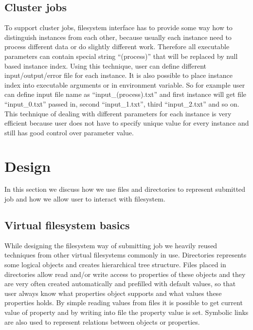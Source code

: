 \documentclass[a4paper,10pt,twocolumn]{article}
\newcommand{\code}[1]{``#1''}
\begin{document}
\subsection{Cluster jobs}
To support cluster jobs, filesystem interface has to provide some way how to distinguish instances from each other, because usually each instance need to process different data or do slightly different work. Therefore all executable parameters can contain special string \code{\textdollar(process)} that will be replaced by null based instance index. Using this technique, user can define different input/output/error file for each instance. It is also possible to place instance index into executable arguments or in environment variable. So for example user can define input file name as \code{input\_\textdollar(process).txt} and first instance will get file \code{input\_0.txt} passed in, second \code{input\_1.txt}, third \code{input\_2.txt} and so on. This technique of dealing with different parameters for each instance is very efficient because user does not have to specify unique value for every instance and still has good control over parameter value.



\section{Design}

In this section we discuss how we use files and directories to represent submitted job and how we allow user to interact with filesystem.

\subsection{Virtual filesystem basics}
While designing the filesystem way of submitting job we heavily reused techniques from other virtual filesystems commonly in use. Directories represents some logical objects and creates hierarchical tree structure. Files placed in directories allow read and/or write access to properties of these objects and they are very often created automatically and prefilled with default values, so that user always know what properties object supports and what values these properties holds. By simple reading values from files it is possible to get current value of property and by writing into file the property value is set. Symbolic links are also used to represent relations between objects or properties.
\end{document}
